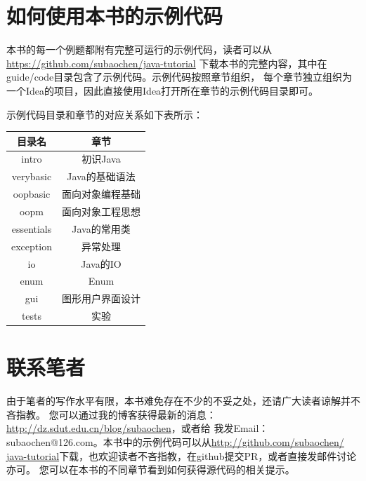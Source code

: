 \section*{如何使用本书的示例代码}
本书的每一个例题都附有完整可运行的示例代码，读者可以从\url{https://github.com/subaochen/java-tutorial}
下载本书的完整内容，其中在guide/code目录包含了示例代码。示例代码按照章节组织，
每个章节独立组织为一个Idea的项目，因此直接使用Idea打开所在章节的示例代码目录即可。

示例代码目录和章节的对应关系如下表所示：
\begin{center}
\begin{tabular}{c|c}
    \hline
    目录名 & 章节 \\
    \hline
    intro & 初识Java \\
    \hline
    verybasic & Java的基础语法 \\
    \hline
    oopbasic & 面向对象编程基础 \\
    \hline
    oopm & 面向对象工程思想 \\
    \hline
    essentials & Java的常用类 \\
    \hline
    exception & 异常处理 \\
    \hline
    io & Java的IO \\
    \hline
    enum & Enum \\
    \hline
    gui & 图形用户界面设计 \\
    \hline
    tests & 实验 \\
    \hline
\end{tabular}
\end{center}

\section*{联系笔者}
由于笔者的写作水平有限，本书难免存在不少的不妥之处，还请广大读者谅解并不吝指教。
您可以通过我的博客获得最新的消息：\url{http://dz.sdut.edu.cn/blog/subaochen}，或者给
我发Email：subaochen@126.com。本书中的示例代码可以从\url{http://github.com/subaochen/
java-tutorial}下载，也欢迎读者不吝指教，在github提交PR，或者直接发邮件讨论亦可。
您可以在本书的不同章节看到如何获得源代码的相关提示。

